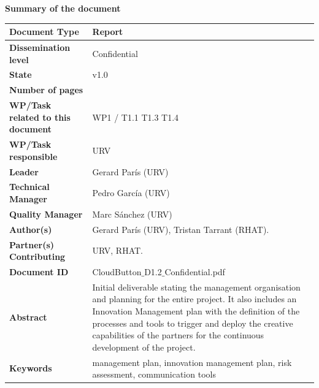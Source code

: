 \documentclass[a4paper,11pt]{article}
\begin{document}
{
\def\arraystretch{1.5} %

{\LARGE \textbf{Summary of the document}}

\begin{center}
    \begin{tabular}{ | l | p{10cm} |}
    \hline
    \cellcolor{gray!25} \textbf{Document Type} & Report  \\ \hline
    \cellcolor{gray!25} \textbf{Dissemination level} & Confidential \\ \hline
    \cellcolor{gray!25} \textbf{State} & v1.0 \\ \hline
    \cellcolor{gray!25} \textbf{Number of pages} & \pageref{LastPage} \\ \hline
    \cellcolor{gray!25} \textbf{WP/Task related to this document} & WP1 / T1.1 T1.3 T1.4 \\ \hline
    \cellcolor{gray!25} \textbf{WP/Task responsible} & URV  \\ \hline
    \cellcolor{gray!25} \textbf{Leader} & Gerard París (URV) \\ \hline
    \cellcolor{gray!25} \textbf{Technical Manager} & Pedro García (URV) \\ \hline
    \cellcolor{gray!25} \textbf{Quality Manager} & Marc Sánchez (URV) \\ \hline
    \cellcolor{gray!25} \textbf{Author(s)} & Gerard París (URV), Tristan Tarrant (RHAT). \\ \hline
    \cellcolor{gray!25} \textbf{Partner(s) Contributing} & URV, RHAT. \\ \hline
    \cellcolor{gray!25} \textbf{Document ID} & CloudButton$\_$D1.2$\_$Confidential.pdf \\ \hline
    \cellcolor{gray!25} \textbf{Abstract} & Initial deliverable stating the management organisation and planning for the entire project. It also includes an
Innovation Management plan with the definition of the processes and tools to trigger and deploy the creative
capabilities of the partners for the continuous development of the project. \\ \hline
    \cellcolor{gray!25} \textbf{Keywords} & management plan, innovation management plan, risk assessment, communication tools \\ \hline
    \end{tabular}
\end{center}
}


\newpage\pagestyle{empty}
\end{document}
